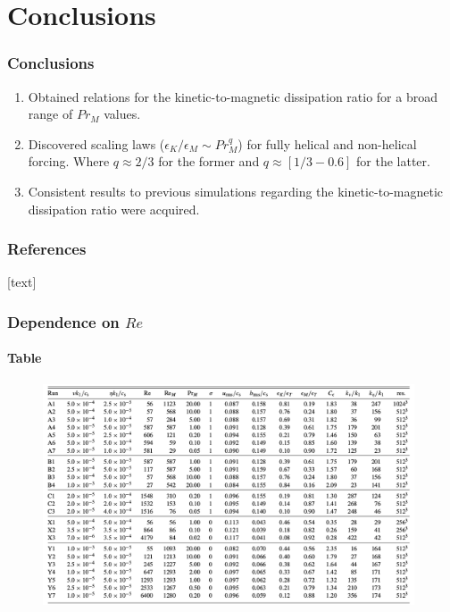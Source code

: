 \documentclass{beamer}
\begin{document}
\section{Conclusions}

\begin{frame}
 \frametitle{Conclusions}
 
 \begin{enumerate}
  \item<1-> Obtained relations for the kinetic-to-magnetic dissipation ratio for a broad range of $Pr_M$ values.
  \item<2-> Discovered scaling laws ($\epsilon_K / \epsilon_M \sim Pr_M^q$) for fully helical and non-helical forcing. Where $q \approx 2/3$ for the former and $q \approx [1/3 - 0.6]$ for the latter.
  \item<3-> Consistent results to previous simulations regarding the kinetic-to-magnetic dissipation ratio were acquired.
 \end{enumerate}
 
\end{frame}


\begin{frame}
\frametitle{References}

[text]



\end{frame}

\begin{frame}
 \frametitle{Dependence on $Re$}
 \framesubtitle{Table}
  
   \begin{figure}[t]
  \includegraphics[width=11cm]{img/table}
  \centering
 \end{figure}
  
\end{frame}
\end{document}
